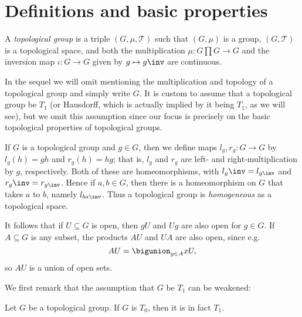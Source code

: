 \documentclass[article, a4paper, 11pt, oneside]{memoir}
\title{\doctitle}
\author{\docauthor}
\numberwithin{equation}{chapter}
\newcommand{\calT}{\mathcal{T}}
\begin{document}
\maketitle

\chapter{Definitions and basic properties}

\begin{definition}
    \label{def:topological_group}
    A \emph{topological group} is a triple $(G, \mu, \calT)$ such that $(G, \mu)$ is a group, $(G, \calT)$ is a topological space, and both the multiplication $\mu \colon G \prod G \to G$ and the inversion map $\iota \colon G \to G$ given by $g \mapsto g\inv$ are continuous.
\end{definition}
%
In the sequel we will omit mentioning the multiplication and topology of a topological group and simply write $G$. It is custom to assume that a topological group be $T_1$ (or Hausdorff, which is actually implied by it being $T_1$, as we will see), but we omit this assumption since our focus is precisely on the basic topological properties of topological groups.

If $G$ is a topological group and $g \in G$, then we define maps $l_g, r_g \colon G \to G$ by $l_g(h) = gh$ and $r_g(h) = hg$; that is, $l_g$ and $r_g$ are left- and right-multiplication by $g$, respectively. Both of these are homeomorphisms, with $l_g\inv = l_{g\inv}$ and $r_g\inv = r_{g\inv}$. Hence if $a, b \in G$, then there is a homeomorphism on $G$ that takes $a$ to $b$, namely $l_{ba\inv}$. Thus a topological group is \emph{homogeneous} as a topological space.

It follows that if $U \subseteq G$ is open, then $gU$ and $Ug$ are also open for $g \in G$. If $A \subseteq G$ is any subset, the products $AU$ and $UA$ are also open, since e.g.
%
\begin{equation*}
    AU = \bigunion_{g \in A} xU,
\end{equation*}
%
so $AU$ is a union of open sets.

We first remark that the assumption that $G$ be $T_1$ can be weakened:

\begin{proposition}
    Let $G$ be a topological group. If $G$ is $T_0$, then it is in fact $T_1$.
\end{proposition}
\end{document}
